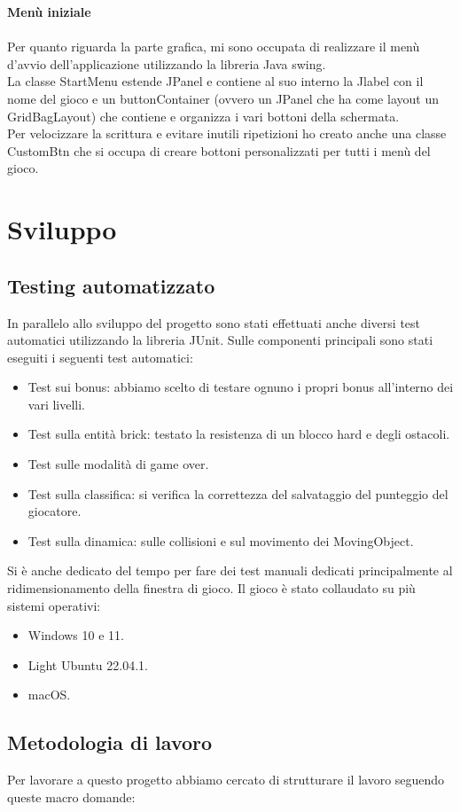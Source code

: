 \documentclass[a4paper,12pt]{report}
\begin{document}
\pagebreak
\textbf{Menù iniziale}\\
\\Per quanto riguarda la parte grafica, mi sono occupata di realizzare il menù d'avvio dell'applicazione utilizzando la libreria Java swing.
\\La classe StartMenu estende JPanel e contiene al suo interno la Jlabel con il nome del gioco e un buttonContainer (ovvero un JPanel che ha come layout un GridBagLayout) che contiene e organizza i vari bottoni della schermata.
\\Per velocizzare la scrittura e evitare inutili ripetizioni ho creato anche una classe CustomBtn che si occupa di creare bottoni personalizzati per tutti i menù del gioco.
\pagebreak
\chapter{Sviluppo}
\section{Testing automatizzato}
In parallelo allo sviluppo del progetto sono stati effettuati anche diversi test automatici utilizzando la libreria JUnit.
Sulle componenti principali sono stati eseguiti i seguenti test automatici:
\begin{itemize}
    \item Test sui bonus: abbiamo scelto di testare ognuno i propri bonus all'interno dei vari livelli.
    \item Test sulla entità brick: testato la resistenza di un blocco hard e degli ostacoli.
    \item Test sulle modalità di game over.
    \item Test sulla classifica: si verifica la correttezza del salvataggio del punteggio del giocatore.
    \item Test sulla dinamica: sulle collisioni e sul movimento dei MovingObject.
\end{itemize}
Si è anche dedicato del tempo per fare dei test manuali dedicati principalmente al ridimensionamento della finestra di gioco.
Il gioco è stato collaudato su più sistemi operativi:
\begin{itemize}
    \item Windows 10 e 11.
    \item Light Ubuntu 22.04.1.
    \item macOS.
\end{itemize}

\section{Metodologia di lavoro}
Per lavorare
a questo progetto abbiamo cercato di strutturare il lavoro seguendo queste macro domande:
\end{document}
